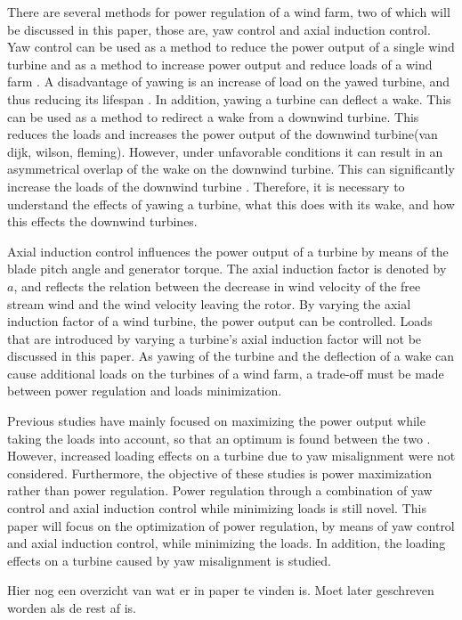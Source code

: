 There are several methods for power regulation of a wind farm, two of which will be discussed in this paper, those are, yaw control and axial induction control. Yaw control can be used as a method to reduce the power output of a single wind turbine and as a method to increase power output and reduce loads of a wind farm \cite{Dijk2016, Wilson2017, Fleming2014, vanDijk2016}. A disadvantage of yawing is an increase of load on the yawed turbine, and thus reducing its lifespan \cite{Zalkind2016,Kanev2017}. In addition, yawing a turbine can deflect a wake. This can be used as a method to redirect a wake from a downwind turbine. This reduces the loads and increases the power output of the downwind turbine(van dijk, wilson, fleming). However, under unfavorable conditions it can result in an asymmetrical overlap of the wake on the downwind turbine. This can significantly increase the loads of the downwind turbine \cite{Wilson2017,Dijk2016}. Therefore, it is necessary to understand the effects of yawing a turbine, what this does with its wake, and how this effects the downwind turbines. 

Axial induction control influences the power output of a turbine by means of the blade pitch angle and generator torque. The axial induction factor is denoted by $a$, and reflects the relation between the decrease in wind velocity of the free stream wind and the wind velocity leaving the rotor. By varying the axial induction factor of a wind turbine, the power output can be controlled. Loads that are introduced by varying a turbine's axial induction factor will not be discussed in this paper. 
As yawing of the turbine and the deflection of a wake can cause additional loads on the turbines of a wind farm, a trade-off must be made between power regulation and loads minimization.

Previous studies have mainly focused on maximizing the power output while taking the loads into account, so that an optimum is found between the two \cite{Dijk2016, vanDijk2016, Wilson2017}. However, increased loading effects on a turbine due to yaw misalignment were not considered. Furthermore, the objective of these studies is power maximization rather than power regulation. %
Power regulation through a combination of yaw control and axial induction control while minimizing loads is still novel. This paper will focus on the optimization of power regulation, by means of yaw control and axial induction control, while minimizing the loads. In addition, the loading effects on a turbine caused by yaw misalignment is studied. 

Hier nog een overzicht van wat er in paper te vinden is. Moet later geschreven worden als de rest af is.
